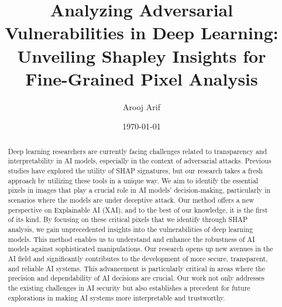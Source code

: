 \documentclass[10pt, conference, a4paper, final]{IEEEtran}
\title{Analyzing Adversarial Vulnerabilities in Deep Learning: Unveiling Shapley Insights for Fine-Grained Pixel Analysis}
\author{Arooj Arif}
\date{\today} %
\begin{document}
\maketitle %


\begin{abstract}
    Deep learning researchers are currently facing challenges related to transparency and interpretability in AI models, 
    especially in the context of adversarial attacks. Previous studies have explored the utility of SHAP signatures, but 
    our research takes a fresh approach by utilizing these tools in a unique way. We aim to identify the essential pixels 
    in images that play a crucial role in AI models' decision-making, particularly in scenarios where the models are under 
    deceptive attack. Our method offers a new perspective on Explainable AI (XAI), and to the best of our knowledge, it is 
    the first of its kind. By focusing on these critical pixels that we identify through SHAP analysis, we gain unprecedented 
    insights into the vulnerabilities of deep learning models. This method enables us to understand and enhance the robustness 
    of AI models against sophisticated manipulations. Our research opens up new avenues in the AI field and significantly contributes 
    to the development of more secure, transparent, and reliable AI systems. This advancement is particularly critical in areas where 
    the precision and dependability of AI decisions are crucial. Our work not only addresses the existing challenges in AI security 
    but also establishes a precedent for future explorations in making AI systems more interpretable and trustworthy.
    

\end{abstract}
\end{document}
